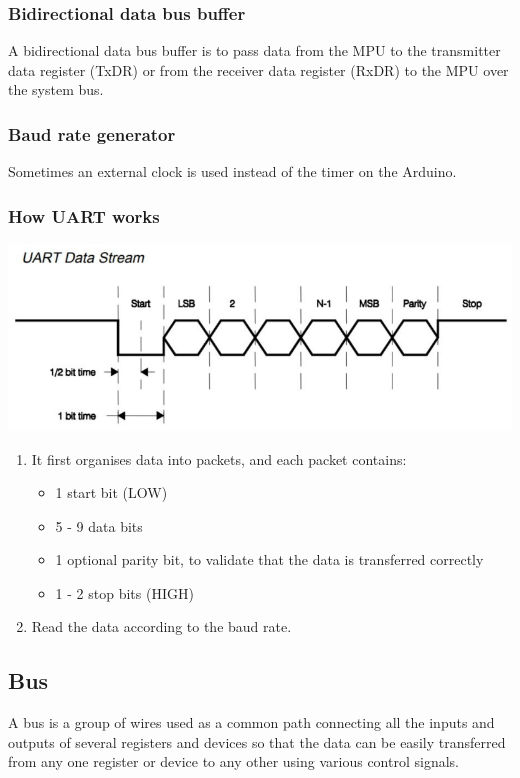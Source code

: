 \documentclass[11pt]{article}
\begin{document}
\subsubsection{Bidirectional data bus buffer}
\label{sec:org2ea7e4b}
A bidirectional data bus buffer is to pass data from the MPU to the transmitter data register (TxDR) or from the receiver data register (RxDR) to the MPU over the system bus.
\subsubsection{Baud rate generator}
\label{sec:org81d4313}
Sometimes an external clock is used instead of the timer on the Arduino.
\subsubsection{How UART works}
\label{sec:orga1c4f46}
\begin{center}
\includegraphics[width=.9\linewidth]{./images/uart-data-stream-diagram.png}
\end{center}
\begin{enumerate}
\item It first organises data into packets, and each packet contains:
\begin{itemize}
\item 1 start bit (LOW)
\item 5 - 9 data bits
\item 1 optional parity bit, to validate that the data is transferred correctly
\item 1 - 2 stop bits (HIGH)
\end{itemize}
\item Read the data according to the baud rate.
\end{enumerate}
\subsection{Bus}
\label{sec:org7d35eba}
A bus is a group of wires used as a common path connecting all the inputs and outputs of several registers and devices so that the data can be easily transferred from any one register or device to any other using various control signals.
\end{document}
